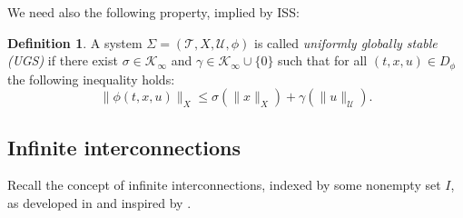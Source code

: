 \documentclass[twocolumn]{IEEEtran} %
\newtheorem{lemma}[theorem]{Lemma}
\theoremstyle{definition}
\newtheorem{definition}[theorem]{Definition}
\newcommand{\Uc}{\mathcal{U}}%
\newcommand{\Kinf}{\mathcal{K_\infty}}%
\newcommand{\ep}{\varepsilon}%
\newcommand{\T}{\ensuremath{\mathcal{T}}}  %
\begin{document}
We need also the following property, implied by ISS:
\begin{definition}
A system $\Sigma = (\T,X,\Uc,\phi)$ is called \emph{uniformly globally stable (UGS)} if there exist $\sigma \in\Kinf$ and $\gamma \in \Kinf \cup \{0\}$ such that for all $(t,x,u) \in D_{\phi}$ the following inequality holds:%
\begin{equation}\label{eq_UGS}
  \|\phi(t,x,u)\|_X \leq \sigma(\|x\|_X) + \gamma(\|u\|_{\Uc}).%
\end{equation}
\end{definition}

%



%


\subsection{Infinite interconnections}
\label{sec:Infinite interconnections}

Recall the concept of infinite interconnections, indexed by some nonempty set $I$, as developed in \cite{MKG20} and inspired by \cite[Definition 3.3]{KaJ07}.
\end{document}
